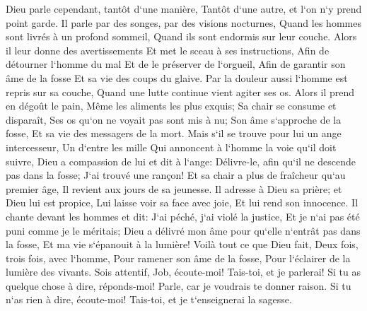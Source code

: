 \verse Dieu parle cependant, tantôt d`une manière, Tantôt d`une autre, et l`on n`y prend point garde. 
\verse Il parle par des songes, par des visions nocturnes, Quand les hommes sont livrés à un profond sommeil, Quand ils sont endormis sur leur couche. 
\verse Alors il leur donne des avertissements Et met le sceau à ses instructions, 
\verse Afin de détourner l`homme du mal Et de le préserver de l`orgueil, 
\verse Afin de garantir son âme de la fosse Et sa vie des coups du glaive. 
\verse Par la douleur aussi l`homme est repris sur sa couche, Quand une lutte continue vient agiter ses os. 
\verse Alors il prend en dégoût le pain, Même les aliments les plus exquis; 
\verse Sa chair se consume et disparaît, Ses os qu`on ne voyait pas sont mis à nu; 
\verse Son âme s`approche de la fosse, Et sa vie des messagers de la mort. 
\verse Mais s`il se trouve pour lui un ange intercesseur, Un d`entre les mille Qui annoncent à l`homme la voie qu`il doit suivre, 
\verse Dieu a compassion de lui et dit à l`ange: Délivre-le, afin qu`il ne descende pas dans la fosse; J`ai trouvé une rançon! 
\verse Et sa chair a plus de fraîcheur qu`au premier âge, Il revient aux jours de sa jeunesse. 
\verse Il adresse à Dieu sa prière; et Dieu lui est propice, Lui laisse voir sa face avec joie, Et lui rend son innocence. 
\verse Il chante devant les hommes et dit: J`ai péché, j`ai violé la justice, Et je n`ai pas été puni comme je le méritais; 
\verse Dieu a délivré mon âme pour qu`elle n`entrât pas dans la fosse, Et ma vie s`épanouit à la lumière! 
\verse Voilà tout ce que Dieu fait, Deux fois, trois fois, avec l`homme, 
\verse Pour ramener son âme de la fosse, Pour l`éclairer de la lumière des vivants. 
\verse Sois attentif, Job, écoute-moi! Tais-toi, et je parlerai! 
\verse Si tu as quelque chose à dire, réponds-moi! Parle, car je voudrais te donner raison. 
\verse Si tu n`as rien à dire, écoute-moi! Tais-toi, et je t`enseignerai la sagesse. 


